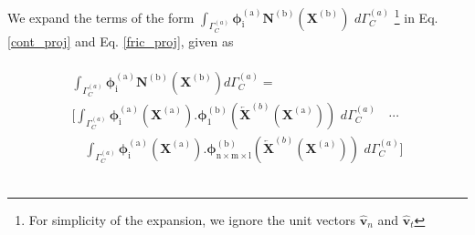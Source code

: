 \iffalse
Or alternalively, the expressions Eq. \eqref{cont_proj} and Eq. \eqref{fric_proj} can be defined as

\begin{equation}\label{cont_proj1}
\mathbf{K}^{(a)}_C=
\sum_{\forall \bm i \in \bm I^{(a)}}p[(\bm N^{\mathrm{(a)}}.\bm{\hat{v}}_n)^T(\bm N^{\mathrm{(a)}}.\bm{\hat{v}}_n) \quad(\bm N^{\mathrm{(a)}}.\bm{\hat{v}}_n)^T(- \bm N^{\mathrm{(b)}}.\bm{\hat{v}}_n)] \bm U^{(a,b)} \,\, d\Gamma^{(a)}_C
\end{equation}

\begin{equation}\label{fric_proj1}
\mathbf{K}^{(a)}_F=
\sum_{\forall \bm i \in \bm I^{(a)}} \mu p[(\bm N^{\mathrm{(a)}}.\bm{\hat{v}}_t)^T(\bm N^{\mathrm{(a)}}.\bm{\hat{v}}_n) \quad(\bm N^{\mathrm{(a)}}.\bm{\hat{v}}_t)^T(- \bm N^{\mathrm{(b)}}.\bm{\hat{v}}_n)] \bm U^{(a,b)} \,\, d\Gamma^{(a)}_C
\end{equation}\\
\\
\fi
 
We expand the terms of the form  
$\int_{\Gamma^{(a)}_C} \bm \phi^{\mathrm{(a)}}_{\mathrm{i}} \bm N^{\mathrm{(b)}}(\bm X^{\mathrm{(b)}}) \,\, d\Gamma^{(a)}_C$ \footnote{For simplicity of the expansion, we ignore the unit vectors $\bm{\hat{v}}_n$ and $\bm{\hat{v}}_t$} in Eq. \eqref{cont_proj} and Eq. \eqref{fric_proj}, given as\\
\\
 \begin{multline}
  \int_{\Gamma^{(a)}_C}  \bm \phi^{\mathrm{(a)}}_{\mathrm{i}} \bm N^{\mathrm{(b)}}(\bm X^{\mathrm{(b)}}) d\Gamma^{(a)}_C =\\ \bigg[ \int_{\Gamma^{(a)}_C} \bm  \phi^{\mathrm{(a)}}_{\mathrm{i}}(\bm X^{\mathrm{(a)}}).\bm  \phi^{\mathrm{(b)}}_{\mathrm{1}}(\overleftarrow{\bm X}^{(b)}(\bm X^{\mathrm{(a)}}))\,\, d\Gamma^{(a)}_C \quad \cdots\\ \quad  \int_{\Gamma^{(a)}_C} \bm  \phi^{\mathrm{(a)}}_{\mathrm{i}}(\bm X^{\mathrm{(a)}}). \bm  \phi^{\mathrm{(b)}}_{\mathrm{n \times m \times l}}(\overleftarrow{\bm X}^{(b)}(\bm X^{\mathrm{(a)}}))\,\,d\Gamma^{(a)}_C \bigg]
\end{multline} \\
 
